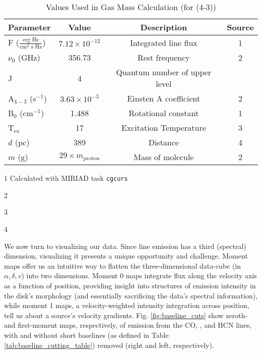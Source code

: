 \begin{table}
  \centering
  \begin{threeparttable}
    \caption{Values Used in Gas Mass Calculation (for \hco(4-3))}
    \label{tab:mass_calc_vals}
    \renewcommand{\arraystretch}{1.2}
    \begin{tabular}{l | c | c | c }
      \toprule \toprule
      Parameter            & Value   & Description         & Source  \\
      \midrule %
      F ($\frac{\text{erg Hz}}{\text{cm$^2$ s Hz}}$) & $7.12 \times 10^{-12}$ & Integrated line flux     &  1 \\
      $\nu_0$ (GHz)         & 356.73 & Rest frequency & 2 \\
      J                     & 4      & Quantum number of upper level & \\
      A$_{4-3}$ (s$^{-1}$)  & $3.63 \times 10^{-3}$  & Einsten A coefficient    & 2 \\
      B$_0$ (cm$^{-1}$)     & 1.488  & Rotational constant      & 1 \\
      T$_\text{ex}$         & 17     & Excitation Temperature   & 3  \\
      $d$ (pc)              & 389    & Distance & 4  \\
      $m$ (g)               & $29 \times m_\text{proton}$ & Mass of molecule & 2 \\
      \bottomrule
    \end{tabular}
    \begin{tablenotes}\footnotesize
      \item[1] Calculated with MIRIAD task \texttt{cgcurs}
      \item[2] \citet{Schoier2005}
      \item[3] \citet{Factor2017}
      \item[4] \citet{GaiaCollaboration2018}
    \end{tablenotes}
  \end{threeparttable}
\end{table}



We now turn to visualizing our data. Since line emission has a third (spectral) dimension, visualizing it presents a unique opportunity and challenge. Moment maps offer us an intuitive way to flatten the three-dimensional data-cube (in $\alpha, \delta, v$) into two dimensions. Moment 0 maps integrate flux along the velocity axis as a function of position, providing insight into structures of emission intensity in the disk's morphology (and essentially sacrificing the data's spectral information), while moment 1 maps, a velocity-weighted intensity integration across position, tell us about a source's velocity gradients. Fig. \ref{fig:baseline_cuts} show zeroth- and first-moment maps, respectively, of emission from the CO, \hco, and HCN lines, with and without short baselines (as defined in Table \ref{tab:baseline_cutting_table}) removed (right and left, respectively).



